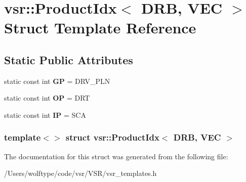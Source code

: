 \hypertarget{structvsr_1_1_product_idx_3_01_d_r_b_00_01_v_e_c_01_4}{\section{vsr\-:\-:Product\-Idx$<$ D\-R\-B, V\-E\-C $>$ Struct Template Reference}
\label{structvsr_1_1_product_idx_3_01_d_r_b_00_01_v_e_c_01_4}
}
\subsection*{Static Public Attributes}
\begin{DoxyCompactItemize}
\item 
\hypertarget{structvsr_1_1_product_idx_3_01_d_r_b_00_01_v_e_c_01_4_a78c0c2602019ddda605b370423e85ef5}{static const int {\bfseries G\-P} = D\-R\-V\-\_\-\-P\-L\-N}\label{structvsr_1_1_product_idx_3_01_d_r_b_00_01_v_e_c_01_4_a78c0c2602019ddda605b370423e85ef5}

\item 
\hypertarget{structvsr_1_1_product_idx_3_01_d_r_b_00_01_v_e_c_01_4_abcc5bdfe1ce7b12434a02ff1eddac6d1}{static const int {\bfseries O\-P} = D\-R\-T}\label{structvsr_1_1_product_idx_3_01_d_r_b_00_01_v_e_c_01_4_abcc5bdfe1ce7b12434a02ff1eddac6d1}

\item 
\hypertarget{structvsr_1_1_product_idx_3_01_d_r_b_00_01_v_e_c_01_4_aba8fb60c59980441f0ceb4cd1b1417a7}{static const int {\bfseries I\-P} = S\-C\-A}\label{structvsr_1_1_product_idx_3_01_d_r_b_00_01_v_e_c_01_4_aba8fb60c59980441f0ceb4cd1b1417a7}

\end{DoxyCompactItemize}
\subsubsection*{template$<$$>$ struct vsr\-::\-Product\-Idx$<$ D\-R\-B, V\-E\-C $>$}



The documentation for this struct was generated from the following file\-:\begin{DoxyCompactItemize}
\item 
/\-Users/wolftype/code/vsr/\-V\-S\-R/vsr\-\_\-templates.\-h\end{DoxyCompactItemize}
